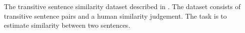 The transitive sentence similarity dataset described in
\cite{kartsaklis2013separating}. The dataset consists of transitive sentence
pairs and a human similarity judgement. The task is to estimate similarity
between two sentences.







